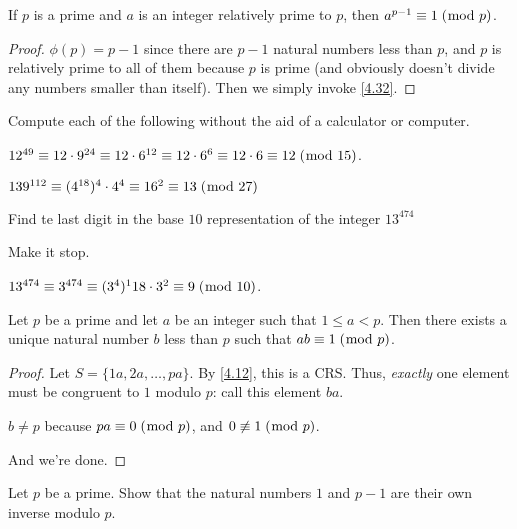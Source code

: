 \documentclass[../main.tex]{subfiles}
\begin{document}
\begin{thm} \label{4.33}
  If $p$ is a prime and $a$ is an integer relatively prime to $p$, then $a^{p-1} \equiv 1 \; (\bmod \; p)$.
\end{thm}

\begin{proof}
  $\phi (p) = p-1$ since there are $p-1$ natural numbers less than $p$, and $p$ is relatively prime to all of them because $p$ is prime (and obviously doesn't divide any numbers smaller than itself). Then we simply invoke \ref{4.32}.
\end{proof}



\begin{ex} \label{4.34}
  Compute each of the following without the aid of a calculator or computer.
\end{ex}

$12^{49} \equiv 12 \cdot 9^{24} \equiv 12 \cdot 6^{12} \equiv 12  \cdot 6^{6} \equiv 12 \cdot 6 \equiv 12 \; (\bmod \; 15)$.

$139^{112} \equiv (4^{18})^4 \cdot 4^4 \equiv 16^2 \equiv 13 \; (\bmod \; 27)$



\begin{ex} \label{4.35}
  Find te last digit in the base $10$ representation of the integer $13^{474}$
\end{ex}

Make it stop.

$13^{474} \equiv 3^{474} \equiv (3^4)^118 \cdot 3^2 \equiv 9 \; (\bmod \; 10)$.



\begin{thm} \label{4.36}
  Let $p$ be a prime and let $a$ be an integer such that $1 \leq a < p$. Then there exists a unique natural number $b$ less than $p$ such that $ab \equiv 1 \; (\bmod \; p)$.
\end{thm}

\begin{proof}
  Let $S = \{1a, 2a, \ldots, pa\}$. By \ref{4.12}, this is a CRS. Thus, \emph{exactly} one element must be congruent to $1$ modulo $p$: call this element $ba$.

  $b \not = p$ because $pa \equiv 0 \; (\bmod \; p)$, and $0 \not \equiv 1 \; (\bmod \; p)$.

  And we're done.
\end{proof}



\begin{ex} \label{4.37}
  Let $p$ be a prime. Show that the natural numbers $1$ and $p-1$ are their own inverse modulo $p$.
\end{ex}
\end{document}
